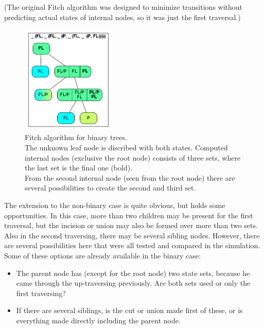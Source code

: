       (The original Fitch algorithm was designed to minimize transitions without predicting actual states 
        of internal nodes, so it was just the first traversal.) \\
        \begin{figure}
          \centering
          \includegraphics[width=0.4\textwidth]{Figures/Fitch1.png}
          \caption{Fitch algorithm for binary trees. \\
            The unknown leaf node is discribed with both states. Computed internal nodes (exclusive the 
            root node) consists of three sets, where the last set is the final one (bold). \\
            From the second internal node (seen from the root node) there are several possibilities to 
            create the second and third set.}
          \label{fig: binary Fitch}
        \end{figure}
      The extension to the non-binary case is quite obvious, but holds some opportunities. In this case, 
        more than two children may be present for the first traversal, but the incision or union may 
        also be formed over more than two sets. Also in the second traversing, there may be several 
        sibling nodes. However, there are several possibilities here that were all tested and compared 
        in the simulation. Some of these options are already available in the binary case:
      \begin{itemize}
        \item The parent node has (except for the root node) two state sets, because he came through 
          the up-traversing previously. Are both sets used or only the first traversing?
        \item If there are several siblings, is the cut or union made first of these, or is everything 
          made directly including the parent node.
      \end{itemize}
